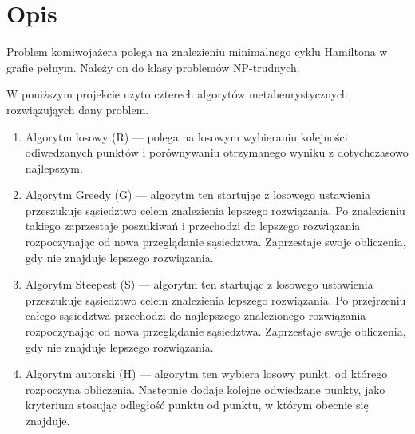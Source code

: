 \section{Opis}

Problem komiwojażera polega na znalezieniu minimalnego cyklu Hamiltona
w grafie pełnym. Należy on do klasy problemów NP-trudnych. 

W poniższym projekcie użyto czterech algorytów metaheurystycznych rozwiązująych 
dany problem. 

\begin{enumerate}

\item Algorytm losowy (R) --- polega na losowym wybieraniu kolejności odiwedzanych punktów i 
porównywaniu otrzymanego wyniku z dotychczasowo najlepszym.

\item Algorytm Greedy (G) --- algorytm ten startując z losowego ustawienia przeszukuje 
sąsiedztwo celem znalezienia lepszego rozwiązania. Po znalezieniu takiego zaprzestaje 
poszukiwań i przechodzi do lepszego rozwiązania rozpoczynając od nowa przeglądanie sąsiedztwa.
Zaprzestaje swoje obliczenia, gdy nie znajduje lepszego rozwiązania.

\item Algorytm Steepest (S) --- algorytm ten startując z losowego ustawienia przeszukuje 
sąsiedztwo celem znalezienia lepszego rozwiązania. Po przejrzeniu całego sąsiedztwa przechodzi 
do najlepszego znalezionego rozwiązania rozpoczynając od nowa przeglądanie sąsiedztwa.
Zaprzestaje swoje obliczenia, gdy nie znajduje lepszego rozwiązania.

\item Algorytm autorski (H) --- algorytm ten wybiera losowy punkt, od którego rozpoczyna obliczenia.
Następnie dodaje kolejne odwiedzane punkty, jako kryterium stosując odległość punktu od punktu, w 
którym obecnie się znajduje.

\end{enumerate}

